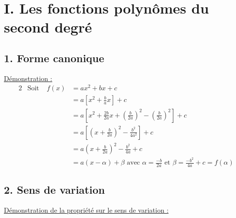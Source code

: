\documentclass[11pt,a4paper]{article}
\title{\titre}
\author{\classe \\ \theme}
\date{}
\begin{document}
\maketitle
\pagestyle{custom}
\thispagestyle{custom}

\section*{I. Les fonctions polynômes du second degré}
\subsection*{1. Forme canonique}

\underline{Démonstration :}
\begin{alignat*}{2}
     & \text{Soit } & f(x) & = ax^2+bx+c                                                                                     \\
     &              &      & = a\left[x^2+\frac{b}{a}x\right]+c                                                              \\
     &              &      & = a\left[x^2+\frac{2b}{2a}x + \left(\frac{b}{2a}\right)^2- \left(\frac{b}{2a}\right)^2\right]+c \\
     &              &      & = a\left[\left(x+\frac{b}{2a}\right)^2-\frac{b^2}{4a^2}\right]+c                                \\
     &              &      & = a\left(x+\frac{b}{2a}\right)^2-\frac{b^2}{4a}+c                                               \\
     &              &      & = a(x-\alpha)+\beta \text{ avec $\alpha=\frac{-b}{2a}$ et $\beta=\frac{-b^2}{4a}+c=f(\alpha)$}
\end{alignat*}

\subsection*{2. Sens de variation}

\underline{Démonstration de la propriété sur le sens de variation :}
\end{document}

